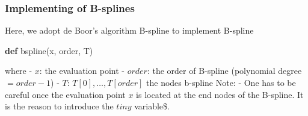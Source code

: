 \documentclass[11pt]{article}
\newenvironment{Shaded}{}{}
\newcommand{\KeywordTok}[1]{\textcolor[rgb]{0.00,0.44,0.13}{\textbf{{#1}}}}
\newcommand{\NormalTok}[1]{{#1}}
\begin{document}
    \subsubsection{Implementing of
B-splines}\label{implementing-of-b-splines}

Here, we adopt de Boor's algorithm B-spline to implement B-spline

\begin{Shaded}
\begin{Highlighting}[]
    \KeywordTok{def}\NormalTok{ bspline(x, order, T)}
\end{Highlighting}
\end{Shaded}

where - \(x\): the evaluation point - \(order\): the order of B-spline
(polynomial degree \(= order-1\)) - \(T\): \(T[0], \ldots, T[order]\)
the nodes b-spline Note: - One has to be careful once the evaluation
point \(x\) is located at the end nodes of the B-spline. It is the
reason to introduce the \(tiny\) variable\$.
\end{document}
